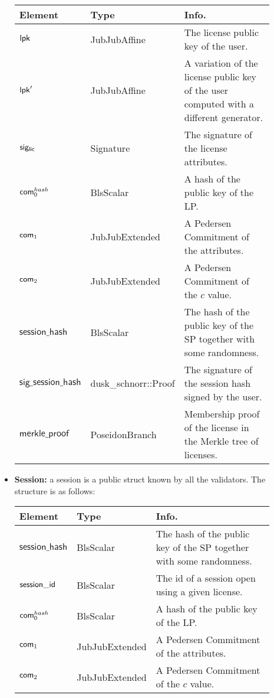 \begin{itemize}
    \begin{center}
        \begin{tabular}{ | p{0.15\linewidth} | p{0.2\linewidth} | p{0.55\linewidth} | } 
        \hline
        \textbf{Element} & \textbf{Type} & \textbf{Info.} \\
        \hline
        $\mathsf{lpk}$ & JubJubAffine & The license public key of the user.\\ 
        $\mathsf{lpk}'$ & JubJubAffine & A variation of the license public key of the user computed with a different generator.\\ 
        $\mathsf{sig_{lic}}$ & Signature & The signature of the license attributes. \\ 
        $\mathsf{com}_0^{hash}$ & BlsScalar & A hash of the public key of the LP. \\ 
        $\mathsf{com}_1$ & JubJubExtended & A Pedersen Commitment of the attributes. \\ 
        $\mathsf{com}_2$ & JubJubExtended & A Pedersen Commitment of the $c$ value. \\ 
        $\mathsf{session\_hash}$ & BlsScalar & The hash of the public key of the SP together with some randomness. \\ 
        $\mathsf{sig\_session\_hash}$ & dusk\_schnorr::Proof & The signature of the session hash signed by the user. \\ 
        $\mathsf{merkle\_proof}$ & PoseidonBranch & Membership proof of the license in the Merkle tree of licenses. \\ 

        \hline
        \end{tabular}
    \end{center}

    \item \textbf{Session:} a session is a public struct known by all the validators. The structure is as follows:

    \begin{center}
        \begin{tabular}{ | p{0.15\linewidth} | p{0.2\linewidth} | p{0.55\linewidth} | } 
        \hline
        \textbf{Element} & \textbf{Type} & \textbf{Info.} \\
        \hline
        $\mathsf{session\_hash}$ & BlsScalar & The hash of the public key of the SP together with some randomness. \\ 
        $\mathsf{session\_id}$ & BlsScalar & The id of a session open using a given license. \\ 
        $\mathsf{com}_0^{hash}$ & BlsScalar & A hash of the public key of the LP. \\ 
        $\mathsf{com}_1$ & JubJubExtended & A Pedersen Commitment of the attributes. \\ 
        $\mathsf{com}_2$ & JubJubExtended & A Pedersen Commitment of the $c$ value. \\ 
        \hline
        \end{tabular}
    \end{center}


\end{itemize}
